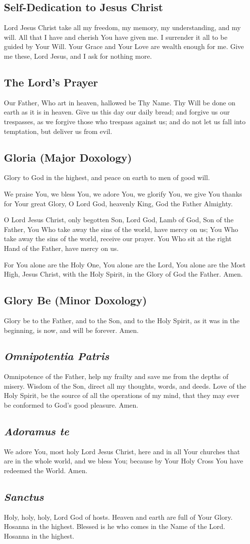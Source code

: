 \documentclass[12pt]{article}
\newcommand{\prayertitle}[1]{\subsection{#1}}
\newcommand{\emphasis}[1]{\emph{#1}}
\newcommand{\emphasis}[1]{\textsl{#1}}
\newcommand{\foreign}[1]{\emphasis{#1}}
\begin{document}
\prayertitle{Self-Dedication to Jesus Christ}
Lord Jesus Christ take all my freedom, my memory, my understanding, and my will.
All that I have and cherish You have given me.
I surrender it all to be guided by Your Will.
Your Grace and Your Love are wealth enough for me.
Give me these, Lord Jesus, and I ask for nothing more.

\prayertitle{The Lord's Prayer}
Our Father, Who art in heaven, hallowed be Thy Name.
Thy Will be done on earth as it is in heaven.
Give us this day our daily bread;
and forgive us our trespasses, as we forgive those who trespass against us;
and do not let us fall into temptation, but deliver us from evil.

\prayertitle{Gloria (Major Doxology)}
\label{prayer:gloria}
Glory to God in the highest, and peace on earth to men of good will.

We praise You, we bless You, we adore You, we glorify You, we give You thanks for Your great Glory, O Lord God, heavenly King, God the Father Almighty.

O Lord Jesus Christ, only begotten Son, Lord God, Lamb of God, Son of the Father, You Who take away the sins of the world, have mercy on us;
You Who take away the sins of the world, receive our prayer.
You Who sit at the right Hand of the Father, have mercy on us.

For You alone are the Holy One, You alone are the Lord, You alone are the Most High, Jesus Christ, with the Holy Spirit, in the Glory of God the Father.
Amen.

\prayertitle{Glory Be (Minor Doxology)}
\label{prayer:glory_be}
Glory be to the Father, and to the Son, and to the Holy Spirit, as it was in the beginning, is now, and will be forever.
Amen.

\prayertitle{\foreign{Omnipotentia Patris}}
\label{prayer:Omnipotentia_Patris}
Omnipotence of the Father, help my frailty and save me from the depths of misery.
Wisdom of the Son, direct all my thoughts, words, and deeds.
Love of the Holy Spirit, be the source of all the operations of my mind, that they may ever be conformed to God's good pleasure.
Amen.

\prayertitle{\foreign{Adoramus te}}
\label{prayer:adoramus_te}
We adore You, most holy Lord Jesus Christ, here and in all Your churches that are in the whole world, and we bless You;
because by Your Holy Cross You have redeemed the World.
Amen.

\prayertitle{\foreign{Sanctus}}
\label{prayer:sanctus}
Holy, holy, holy, Lord God of hosts.
Heaven and earth are full of Your Glory.
Hosanna in the highest.
Blessed is he who comes in the Name of the Lord.
Hosanna in the highest.
\end{document}
